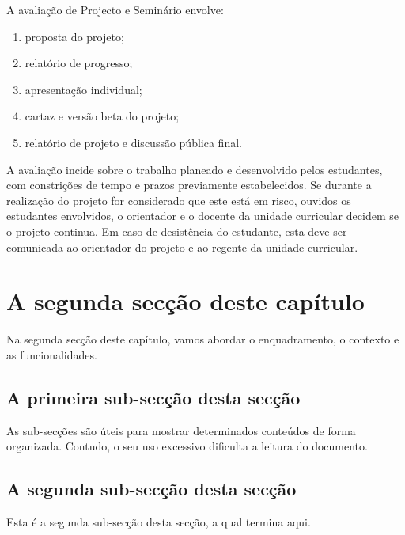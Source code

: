 A avaliação de Projecto e Seminário envolve:
\begin{enumerate}
	\item proposta do projeto;
	\item relatório de progresso;
	\item apresentação individual;
	\item cartaz e versão beta do projeto;
	\item relatório de projeto e discussão pública final.
\end{enumerate}

A avaliação incide sobre o trabalho planeado e desenvolvido pelos estudantes, com constrições de tempo e prazos previamente estabelecidos. Se durante a realização do projeto for considerado que este está em risco, ouvidos os estudantes envolvidos, o orientador e o docente da unidade curricular decidem se o projeto continua. Em caso de desistência do estudante, esta deve ser comunicada ao orientador do projeto e ao regente da unidade curricular.

\section{A segunda secção deste capítulo} \label{sec32}
Na segunda secção deste capítulo, vamos abordar o enquadramento,
o contexto e as funcionalidades.

\subsection{A primeira sub-secção desta secção} \label{sec321}
As sub-secções são úteis para mostrar determinados conteúdos de forma
organizada. Contudo, o seu uso excessivo dificulta a leitura do documento.

\subsection{A segunda sub-secção desta secção} \label{sec322}
Esta é a segunda sub-secção desta secção, a qual termina aqui.

